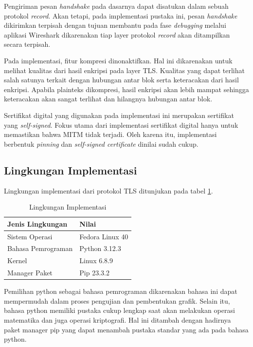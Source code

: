 Pengiriman pesan \emph{handshake} pada dasarnya dapat disatukan dalam sebuah protokol \emph{record}. Akan tetapi, pada implementasi pustaka ini, pesan \emph{handshake} dikirimkan terpisah dengan tujuan  membantu pada fase \emph{debugging} melalui aplikasi Wireshark dikarenakan tiap layer protokol \emph{record} akan ditampilkan secara terpisah.

Pada implementasi, fitur kompresi dinonaktifkan. Hal ini dikarenakan untuk melihat kualitas dari hasil enkripsi pada layer TLS. Kualitas yang dapat terlihat salah satunya terkait dengan hubungan antar blok serta keteracakan dari hasil enkripsi. Apabila plainteks dikompresi, hasil enkripsi akan lebih mampat sehingga keteracakan akan sangat terlihat dan hilangnya hubungan antar blok.

Sertifikat digital yang digunakan pada implementasi ini merupakan sertifikat yang \emph{self-signed}. Fokus utama dari implementasi sertifikat digital hanya untuk memastikan bahwa MITM tidak terjadi. Oleh karena itu, implementasi berbentuk \emph{pinning} dan \emph{self-signed certificate} dinilai sudah cukup.

\subsection{Lingkungan Implementasi}

Lingkungan implementasi dari protokol TLS ditunjukan pada tabel \ref{tab:impl.env}.

\begin{table}[!h]
  \centering
  \caption{Lingkungan Implementasi} \label{tab:impl.env}
  \begin{tabular}{|p{3cm}|p{6cm}|}
    \hline
    \textbf{Jenis Lingkungan} & \textbf{Nilai} \\ \hline
    Sistem Operasi & Fedora Linux 40 \\ \hline
    Bahasa Pemrograman & Python 3.12.3 \\ \hline
    Kernel & Linux 6.8.9 \\ \hline
    Manager Paket & Pip 23.3.2 \\ \hline
  \end{tabular}
\end{table}

Pemilihan python sebagai bahasa pemrograman dikarenakan bahasa ini dapat mempermudah dalam proses pengujian dan pembentukan grafik. Selain itu, bahasa python memiliki pustaka cukup lengkap saat akan melakukan operasi matematika dan juga operasi kriptografi. Hal ini ditambah dengan hadirnya paket manager pip yang dapat menambah pustaka standar yang ada pada bahasa python.

